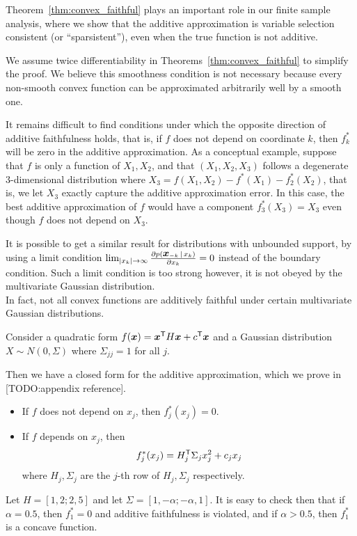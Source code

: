 Theorem~\ref{thm:convex_faithful} plays an important role in our
finite sample analysis, where we show that the additive
approximation is variable selection consistent (or ``sparsistent''), even when the true function is not
additive.

\begin{remark}
  We assume twice differentiability in
  Theorems~\ref{thm:convex_faithful} to simplify the proof. 
  We believe
  this smoothness condition is not necessary because every non-smooth
  convex function can be approximated arbitrarily well by a smooth
  one.  
\end{remark}

\begin{remark} 
It remains difficult to find conditions under which the opposite direction of additive faithfulness holds, that is, if $f$ does not depend on coordinate $k$, then $f_k^*$ will be zero in the additive approximation. As a conceptual example, suppose that $f$ is only a function of $X_1, X_2$, and that $(X_1, X_2, X_3)$ follows a degenerate 3-dimensional distribution where $X_3 = f(X_1, X_2) - f^*(X_1) - f^*_2(X_2)$, that is, we let $X_3$ exactly capture the additive approximation error. In this case, the best additive approximation of $f$ would have a component $f^*_3(X_3) = X_3$ even though $f$ does not depend on $X_3$. 
\end{remark}

It is possible to get a similar result for distributions with unbounded support, by using a limit condition $\lim_{|x_k| \rightarrow \infty} \frac{\partial p(\mbox{\boldmath $x$}_{-k} {\,|\,} x_k)}{\partial x_k} = 0$ instead of the boundary condition. Such a limit condition is too strong however, it is not obeyed by the multivariate Gaussian distribution. \\

In fact, not all convex functions are additively faithful under certain multivariate Gaussian distributions. 

\begin{example}
\label{examp:gaussian_counterexample}
Consider a quadratic form $f( \mbox{\boldmath $x$}) = \mbox{\boldmath $x$}^{\mathsf{T}} H \mbox{\boldmath $x$} + c^{\mathsf{T}} \mbox{\boldmath $x$}$ and a Gaussian distribution $X \sim N(0, \Sigma)$ where $\Sigma_{jj} = 1$ for all $j$.

Then we have a closed form for the additive approximation, which we prove in [TODO:appendix reference].
\begin{itemize}
\item If $f$ does not depend on $x_j$, then $f^*_j(x_j) = 0$.
\item If $f$ depends on $x_j$, then
\begin{equation}
f^*_j(x_j) = H_j^{\mathsf{T}} \Sigma_j x_j^2 + c_j x_j
\end{equation}
where $H_j, \Sigma_j$ are the $j$-th row of $H_j, \Sigma_j$ respectively. 
\end{itemize}
Let $H = [1, 2; 2,5]$ and let $\Sigma = [1, -\alpha; -\alpha, 1]$. It is easy to check then that if $\alpha=0.5$, then $f^*_1 = 0$ and additive faithfulness is violated, and if $\alpha > 0.5$, then $f^*_1$ is a concave function.
\end{example}

